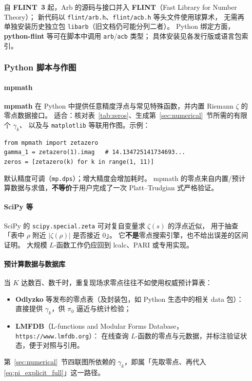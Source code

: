 自 \textbf{FLINT~3} 起，Arb 的源码与接口并入 \textbf{FLINT}（Fast Library for Number Theory）；
新代码以 \texttt{flint/arb.h}、\texttt{flint/acb.h} 等头文件使用球算术，
无需再单独安装历史独立包 \texttt{libarb}（旧文档仍可能分列二者）。
Python 绑定方面，\textbf{python-flint} 等可在脚本中调用 \texttt{arb}/\texttt{acb} 类型；
具体安装见各发行版或语言包索引。

\subsubsection{Python 脚本与作图}

\paragraph{mpmath}
\textbf{mpmath} 在 Python 中提供任意精度浮点与常见特殊函数，并内置 Riemann $\zeta$ 的零点数据接口。
适合：核对表~\ref{tab:zeros}、生成第~\ref{sec:numerical}~节所需的有限个 $\gamma_k$、
以及与 \texttt{matplotlib} 等联用作图。示例：
\begin{verbatim}
from mpmath import zetazero
gamma_1 = zetazero(1).imag   # 14.134725141734693...
zeros = [zetazero(k) for k in range(1, 11)]
\end{verbatim}
默认精度可调（\texttt{mp.dps}）；增大精度会增加耗时。
mpmath 的零点来自内置/预计算数据与求值，\textbf{不等价}于用户完成了一次 Platt--Trudgian 式严格验证。

\paragraph{SciPy 等}
SciPy 的 \texttt{scipy.special.zeta} 可对复自变量求 $\zeta(s)$ 的浮点近似，
用于抽查「表中 $\rho$ 附近 $|\zeta(\rho)|$ 是否接近 $0$」。
它\textbf{不是}零点搜索引擎，也不给出误差的区间证明。
大规模 $L$-函数工作仍应回到 lcalc、PARI 或专用实现。

\paragraph{预计算数据与数据库}
当 $K$ 达数百、数千时，重复现场求零点往往不如使用权威预计算表：
\begin{itemize}
  \item \textbf{Odlyzko} 等发布的零点表（及封装包，如 Python 生态中的相关 data 包）：
        直接提供 $\gamma_k$，供 $\pi_0$ 逼近与统计检验；
  \item \textbf{LMFDB}（L-functions and Modular Forms Database，\texttt{https://www.lmfdb.org}）：
        在线查询 $L$-函数的零点与元数据，并标注验证状态，便于对照与引用。
\end{itemize}
第~\ref{sec:numerical}~节四联图所依赖的 $\gamma_k$，即属「先取零点、再代入 \eqref{eq:pi_explicit_full}」这一路径。

